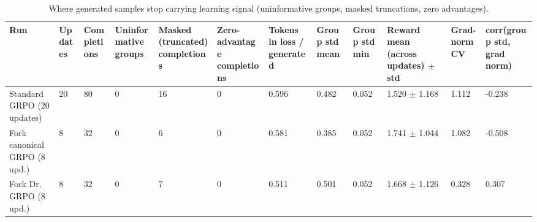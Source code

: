\begin{table}[t]
\centering
\small
\caption{Where generated samples stop carrying learning signal (uninformative groups, masked truncations, zero advantages).}
\begin{tabular}{llllllllllll}
\toprule
Run & Updates & Completions & Uninformative groups & Masked (truncated) completions & Zero-advantage completions & Tokens in loss / generated & Group std mean & Group std min & Reward mean (across updates) $\pm$ std & Grad-norm CV & corr(group std, grad norm) \\
\midrule
Standard GRPO (20 updates) & 20 & 80 & 0 & 16 & 0 & 0.596 & 0.482 & 0.052 & 1.520 $\pm$ 1.168 & 1.112 & -0.238 \\
Fork canonical GRPO (8 upd.) & 8 & 32 & 0 & 6 & 0 & 0.581 & 0.385 & 0.052 & 1.741 $\pm$ 1.044 & 1.082 & -0.508 \\
Fork Dr. GRPO (8 upd.) & 8 & 32 & 0 & 7 & 0 & 0.511 & 0.501 & 0.052 & 1.668 $\pm$ 1.126 & 0.328 & 0.307 \\
\bottomrule
\end{tabular}
\end{table}
